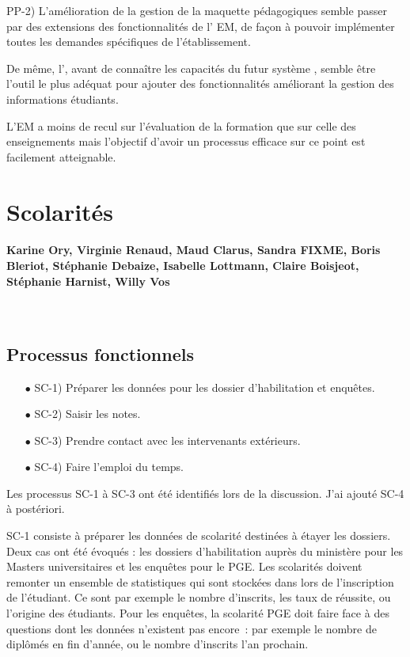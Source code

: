 \documentclass{book}
\begin{document}
PP-2) L'amélioration de la gestion de la maquette pédagogiques semble passer par
des extensions des fonctionnalités de l' EM, de façon à pouvoir
implémenter toutes les demandes spécifiques de l'établissement.

De même, l', avant de connaître les capacités du futur 
système , semble être l'outil le plus adéquat pour ajouter des 
fonctionnalités améliorant la gestion des informations étudiants.

L'EM a moins de recul sur l'évaluation de la formation que sur celle des enseignements
mais l'objectif d'avoir un processus efficace sur ce point est facilement atteignable.


 
\section{Scolarités}


\paragraph{Karine Ory, Virginie Renaud, Maud Clarus, Sandra FIXME, Boris Bleriot, 
Stéphanie Debaize, Isabelle Lottmann, Claire Boisjeot, Stéphanie Harnist, Willy Vos}
~\\

\subsection{Processus fonctionnels}


\begin{itemize}
\item[$\bullet$] SC-1) Préparer les données pour les dossier d'habilitation et enquêtes.
\item[$\bullet$] SC-2) Saisir les notes.
\item[$\bullet$] SC-3) Prendre contact avec les intervenants extérieurs.
\item[$\bullet$] SC-4) Faire l'emploi du temps.
\end{itemize}

Les processus SC-1 à SC-3 ont été identifiés lors de la discussion.
J'ai ajouté SC-4 à postériori.


\bigskip 
SC-1 consiste à préparer les données de scolarité destinées à étayer les dossiers.
Deux cas ont été évoqués : les dossiers d'habilitation auprès du ministère pour les 
Masters universitaires et les enquêtes pour le PGE. Les scolarités doivent 
remonter un ensemble de statistiques qui sont stockées dans  lors
de l'inscription de l'étudiant. Ce sont par exemple le nombre d'inscrits, les 
taux de réussite, ou l'origine des étudiants. Pour les enquêtes, la scolarité
PGE doit faire face à des questions dont les données n'existent pas encore~:
par exemple le nombre de diplômés en fin d'année, ou le nombre d'inscrits
l'an prochain.\\ 
\end{document}
